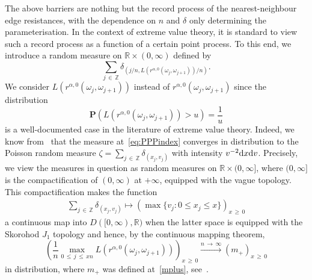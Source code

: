 \documentclass[AHL,Unicode,longabstracts,published]{cedram}
\newcommand{\Z}{\mathbb Z}
\newcommand{\R}{\mathbb R}
\newcommand{\bfP}{\mathbf{P}}
\newcommand{\dd}{\text{\upshape{d}}}
\begin{document}
The above barriers are nothing but the record process of the nearest-neighbour edge resistances, with the dependence on $n$ and $\delta$ only determining the parameterisation. In the context of extreme value theory, it is standard to view such a record process as a function of a certain point process. To this end, we introduce a random measure on $\R\times (0,\infty)$ defined by
\begin{equation}\label{eq:PPPindex}
\sum_{j\,\in\,\Z}\delta_{\left(j/n, L\left(r^{\alpha,0}\left(\omega_j,\omega_{j+1}\right)\right)/n\right)}.
\end{equation}
We consider $L(r^{\alpha,0}(\omega_j,\omega_{j+1}))$ instead of $r^{\alpha,0}(\omega_j,\omega_{j+1})$ since the distribution
\begin{equation}\label{ltail}
\bfP\left(L\left(r^{\alpha,0}\left(\omega_j,\omega_{j+1}\right)\right)>u\right)=\frac{1}{u}
\end{equation}
is a well-documented case in the literature of extreme value theory. Indeed, we know from~\cite[Corollary~4.19]{Res87} that the measure at~\eqref{eq:PPPindex} converges in distribution to the Poisson random measure $\zeta=\sum_{j\,\in\,\Z} \delta_{(x_j, v_j)}$ with intensity $v^{-2}\dd x \dd v$. Precisely, we view the measures in question as random measures on $\R \times (0,\infty]$, where $(0,\infty]$ is the compactification of $(0,\infty)$ at $+\infty$, equipped with the vague topology. This compactification makes the function
\begin{align*}
\sum_{j\,\in\,\Z} \delta_{\left(x_j, v_j\right)}\mapsto \left(\max\{v_j\colon 0\le x_j \le x\}\right)_{x\,\geq\,0}
\end{align*}
a continuous map into $D([0,\infty),\R)$ when the latter space is equipped with the Skorohod $J_1$ topology and hence, by the continuous mapping theorem,
\[
\left(\frac{1}{n} \max_{0\,\le\,j\,\le\,xn} L\left(r^{\alpha,0}\left(\omega_j,\omega_{j+1}\right)\right) \right)_{x\,\geq\,0}\xrightarrow{n\,\to\,\infty} (m_+)_{x\,\geq\,0}
\]
in distribution, where $m_+$ was defined at~\eqref{mplus}, see~\cite[Proposition~4.20]{Res87}.
\end{document}
